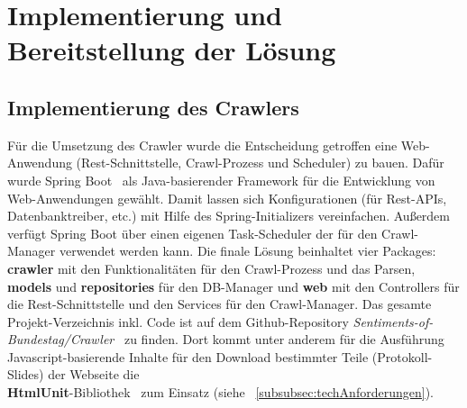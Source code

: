 \section{Implementierung und Bereitstellung der Lösung}\label{sec:02_04_implementierung_bereitstellung}

\subsection{Implementierung des Crawlers}
Für die Umsetzung des Crawler wurde die Entscheidung getroffen eine Web-Anwendung (Rest-Schnittstelle, Crawl-Prozess und Scheduler) zu bauen. Dafür wurde Spring Boot~\cite{SpringBoot242} als Java-basierender Framework für die Entwicklung von Web-Anwendungen gewählt. Damit lassen sich Konfigurationen (für Rest-APIs, Datenbanktreiber, etc.) mit Hilfe des Spring-Initializers vereinfachen. Außerdem verfügt Spring Boot über einen eigenen Task-Scheduler der für den Crawl-Manager verwendet werden kann. Die finale Lösung beinhaltet vier Packages: \textbf{crawler} mit den Funktionalitäten für den Crawl-Prozess und das Parsen, \textbf{models} und \textbf{repositories} für den DB-Manager und \textbf{web} mit den Controllers für die Rest-Schnittstelle und den Services für den Crawl-Manager. Das gesamte Projekt-Verzeichnis inkl. Code ist auf dem Github-Repository \textit{Sentiments-of-Bundestag/Crawler}~\cite{Crawler2021} zu finden. Dort kommt unter anderem für die Ausführung Javascript-basierende Inhalte für den Download bestimmter Teile (Protokoll-Slides) der Webseite die \\\textbf{HtmlUnit}-Bibliothek~\cite{HtmlUnit2021} zum Einsatz (siehe ~\ref{subsubsec:techAnforderungen}).

